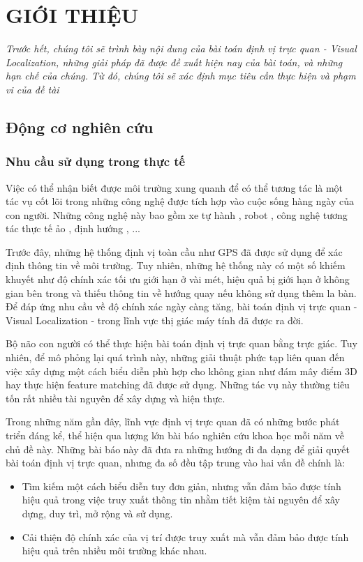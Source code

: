 \chapter{GIỚI THIỆU}

\textit{Trước hết, chúng tôi sẽ trình bày nội dung của bài toán định vị trực quan - Visual Localization, những giải pháp đã được đề xuất hiện nay của bài toán, và những hạn chế của chúng. Từ đó, chúng tôi sẽ xác định mục tiêu cần thực hiện và phạm vi của đề tài}

\section{Động cơ nghiên cứu}

\subsection{Nhu cầu sử dụng trong thực tế}

Việc có thể nhận biết được môi trường xung quanh để có thể tương tác là một tác vụ cốt lõi trong những công nghệ được tích hợp vào cuộc sống hàng ngày của con người. Những công nghệ này bao gồm xe tự hành \cite{chaabane2021end}, robot \cite{sunderhauf2015place}, công nghệ tương tác thực tế ảo \cite{middelberg2014scalable}, định hướng \cite{sarlin2023orienternet}, ...

Trước đây, những hệ thống định vị toàn cầu như GPS đã được sử dụng để xác định thông tin về môi trường. Tuy nhiên, những hệ thống này có một số khiếm khuyết như độ chính xác tối ưu giới hạn ở vài mét, hiệu quả bị giới hạn ở không gian bên trong và thiếu thông tin về hướng quay nếu không sử dụng thêm la bàn. Để đáp ứng nhu cầu về độ chính xác ngày càng tăng, bài toán định vị trực quan - Visual Localization - trong lĩnh vực thị giác máy tính đã được ra đời.

Bộ não con người có thể thực hiện bài toán định vị trực quan bằng trực giác. Tuy nhiên, để mô phỏng lại quá trình này, những giải thuật phức tạp liên quan đến việc xây dựng một cách biểu diễn phù hợp cho không gian như đám mây điểm 3D hay thực hiện feature matching đã được sử dụng. Những tác vụ này thường tiêu tốn rất nhiều tài nguyên để xây dựng và hiện thực.

Trong những năm gần đây, lĩnh vực định vị trực quan đã có những bước phát triển đáng kể, thể hiện qua lượng lớn bài báo nghiên cứu khoa học mỗi năm về chủ đề này. Những bài báo này đã đưa ra những hướng đi đa dạng để giải quyết bài toán định vị trực quan, nhưng đa số đều tập trung vào hai vấn đề chính là:
\begin{itemize}
    \item Tìm kiếm một cách biểu diễn tuy đơn giản, nhưng vẫn đảm bảo được tính hiệu quả trong việc truy xuất thông tin nhằm tiết kiệm tài nguyên để xây dựng, duy trì, mở rộng và sử dụng.
    \item Cải thiện độ chính xác của vị trí được truy xuất mà vẫn đảm bảo được tính hiệu quả trên nhiều môi trường khác nhau.
\end{itemize}
\newpage
